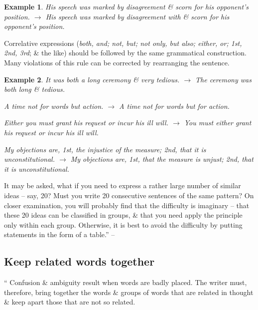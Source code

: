 \documentclass[oneside]{book}
\numberwithin{equation}{section}
\newtheorem{example}{Example}[chapter]
\begin{document}
\begin{example}
	His speech was marked by disagreement \& scorn for his opponent's position. $\to$ His speech was marked by disagreement with \& scorn for his opponent's position.
\end{example}
Correlative expressions (\textit{both, and; not, but; not only, but also; either, or; 1st, 2nd, 3rd}; \& the like) should be followed by the same grammatical construction. Many violations of this rule can be corrected by rearranging the sentence.

\begin{example}
	It was both a long ceremony \& very tedious. $\to$ The ceremony was both long \& tedious.
	
	A time not for words but action. $\to$ A time not for words but for action.
	
	Either you must grant his request or incur his ill will. $\to$ You must either grant his request or incur his ill will.
	
	My objections are, 1st, the injustice of the measure; 2nd, that it is unconstitutional. $\to$ My objections are, 1st,  that the measure is unjust; 2nd, that it is unconstitutional.
\end{example}
It may be asked, what if you need to express a rather large number of similar ideas -- say, 20? Must you write 20 consecutive sentences of the same pattern? On closer examination, you will probably find that the difficulty is imaginary -- that these 20 ideas can be classified in groups, \& that you need apply the principle only within each group. Otherwise, it is best to avoid the difficulty by putting statements in the form of a table.'' -- \cite[Chap. 2, Sect. 19, pp. 41--42]{Strunk_White2019}

\subsection{Keep related words together}
`` Confusion \& ambiguity result when words are badly placed. The writer must, therefore, bring together the words \& groups of words that are related in thought \& keep apart those that are not so related.
\end{document}
